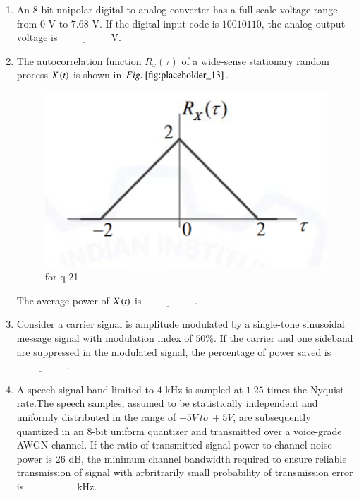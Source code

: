 \documentclass[journal,12pt,onecolumn]{IEEEtran}
\theoremstyle{remark}
\begin{document}
\begin{enumerate}
\hfill {}

\item An $8$-bit unipolar digital-to-analog converter  has a full-scale voltage range from $0$ V to $7.68$ V. If the digital input code is $10010110$, the analog output voltage  is $\underline{\hspace{2cm}}$ V.  

\hfill {}

\item The autocorrelation function $R_x(\tau)$ of a wide-sense stationary random process $X\left(t\right)$ is shown in $\figref{fig:placeholder_13}$. 
\begin{figure}[H]
    \centering
    \includegraphics[width=0.4\columnwidth]{figs/13.png}
    \caption{\centering for q-21}
    \label{fig:placeholder_13}
\end{figure}
The average power of $X\left(t\right)$ is  $\underline{\hspace{2cm}}$ . 

\hfill {}

\item Consider a carrier signal is amplitude modulated by a single-tone sinusoidal message signal with modulation index of $50\%$. If the carrier and one sideband are suppressed in the modulated signal, the percentage of power saved  is  $\underline{\hspace{2cm}}$ . 

\hfill {}

\item A speech signal band-limited to $4$ kHz is sampled at $1.25$ times the Nyquist rate.The speech samples, assumed to be statistically independent and uniformly distributed in the range of $-5V \ to \ +5V$, are subsequently quantized in an $8$-bit uniform quantizer and transmitted over a voice-grade AWGN channel. If the ratio of transmitted signal power to channel noise power is 26 dB, the minimum channel bandwidth required to ensure reliable transmission of signal with arbritrarily small probability of transmission error  is $\underline{\hspace{2cm}}$ kHz.  


\end{enumerate}
\end{document}
